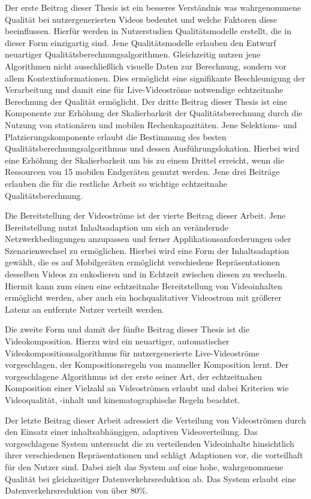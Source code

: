 	Der erste Beitrag dieser Thesis ist ein besseres Verst\"andnis was wahrgenommene Qualit\"at bei nutzergenerierten Videos bedeutet und welche Faktoren diese beeinflussen.
	Hierf\"ur werden in Nutzerstudien Qualit\"atsmodelle erstellt, die in dieser Form einzigartig sind.
	Jene Qualit\"atsmodelle erlauben den Entwurf neuartiger Qualit\"atsberechnungsalgorithmen. %
	Gleichzeitig nutzen jene Algorithmen nicht ausschlie{\ss}lich visuelle Daten zur Berechnung, sondern vor allem Kontextinformationen.
	Dies ermöglicht eine signifikante Beschleunigung der Verarbeitung und damit eine f\"ur Live-Videostr\"ome notwendige echtzeitnahe Berechnung der Qualit\"at erm\"oglicht.
	Der dritte Beitrag dieser Thesis ist eine Komponente zur Erh\"ohung der Skalierbarkeit der Qualit\"atsberechnung durch die Nutzung von station\"aren und mobilen Rechenkapazit\"aten.
	Jene Selektions- und Platzierungskomponente erlaubt die Bestimmung des besten Qualit\"atsberechnungsalgorithmus und dessen Ausf\"uhrungslokation.
	Hierbei wird eine Erh\"ohung der Skalierbarkeit um bis zu einem Drittel erreicht, wenn die Ressourcen von 15 mobilen Endger\"aten genutzt werden.
	Jene drei Beitr\"age erlauben die f\"ur die restliche Arbeit so wichtige echtzeitnahe Qualit\"atsberechnung.

	Die Bereitstellung der Videostr\"ome ist der vierte Beitrag dieser Arbeit. Jene Bereitstellung nutzt Inhaltsadaption um sich an ver\"andernde Netzwerkbedingungen anzupassen und ferner Applikationsanforderungen oder Szenarienwechsel zu erm\"oglichen.
	Hierbei wird eine Form der Inhaltsadaption  gew\"ahlt, die es auf Mobilger\"aten erm\"oglicht verschiedene Repr\"asentationen desselben Videos zu enkodieren und in Echtzeit zwischen diesen zu wechseln. 
	Hiermit kann zum einen eine echtzeitnahe Bereitstellung von Videoinhalten erm\"oglicht werden, aber auch ein hochqualitativer Videostrom mit gr\"o{\ss}erer Latenz an entfernte Nutzer verteilt werden.
	
	Die zweite Form und damit der f\"unfte Beitrag dieser Thesis ist die Videokomposition.
	Hierzu wird ein neuartiger, automatischer Videokompositionsalgorithmus f\"ur nutzergenerierte Live-Videostr\"ome vorgeschlagen, der Kompositionsregeln von manueller Komposition lernt.
	Der vorgeschlagene Algorithmus ist der erste seiner Art, der echtzeitnahen Komposition einer Vielzahl an Videostr\"omen erlaubt und dabei Kriterien wie Videoqualit\"at, -inhalt und kinematographische Regeln beachtet.

	Der letzte Beitrag dieser Arbeit adressiert die Verteilung von Videostr\"omen durch den Einsatz einer inhaltsabh\"angigen, adaptiven Videoverteilung.
	Das vorgeschlagene System untersucht die zu verteilenden Videoinhalte hinsichtlich ihrer verschiedenen Repr\"asentationen und schl\"agt Adaptionen vor, die vorteilhaft f\"ur den Nutzer sind.
	Dabei zielt das System auf eine hohe, wahrgenommene Qualit\"at bei gleichzeitiger Datenverkehrsreduktion ab.
	Das System erlaubt eine Datenverkehrsreduktion von \"uber 80\%.
\endinput
